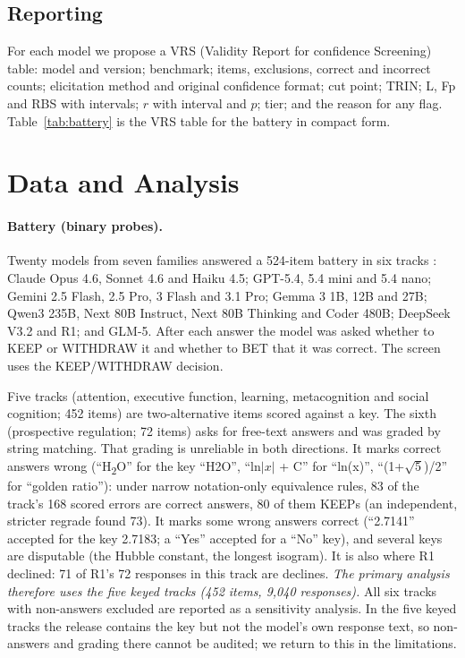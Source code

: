 \documentclass[11pt,a4paper]{article}
\begin{document}
\subsection{Reporting}

For each model we propose a VRS (Validity Report for confidence Screening) table: model and version; benchmark; items, exclusions, correct and incorrect counts; elicitation method and original confidence format; cut point; TRIN; L, Fp and RBS with intervals; $r$ with interval and $p$; tier; and the reason for any flag. Table~\ref{tab:battery} is the VRS table for the battery in compact form.

\section{Data and Analysis}\label{sec:data}

\paragraph{Battery (binary probes).} Twenty models from seven families answered a 524-item battery in six tracks \citep{cacioli2026c}: Claude Opus 4.6, Sonnet 4.6 and Haiku 4.5; GPT-5.4, 5.4 mini and 5.4 nano; Gemini 2.5 Flash, 2.5 Pro, 3 Flash and 3.1 Pro; Gemma 3 1B, 12B and 27B; Qwen3 235B, Next 80B Instruct, Next 80B Thinking and Coder 480B; DeepSeek V3.2 and R1; and GLM-5. After each answer the model was asked whether to KEEP or WITHDRAW it and whether to BET that it was correct. The screen uses the KEEP/WITHDRAW decision.

Five tracks (attention, executive function, learning, metacognition and social cognition; 452 items) are two-alternative items scored against a key. The sixth (prospective regulation; 72 items) asks for free-text answers and was graded by string matching. That grading is unreliable in both directions. It marks correct answers wrong (``H\textsubscript{2}O'' for the key ``H2O'', ``ln$|x|$ + C'' for ``ln(x)'', ``(1+$\sqrt{5}$)/2'' for ``golden ratio''): under narrow notation-only equivalence rules, 83 of the track's 168 scored errors are correct answers, 80 of them KEEPs (an independent, stricter regrade found 73). It marks some wrong answers correct (``2.7141'' accepted for the key 2.7183; a ``Yes'' accepted for a ``No'' key), and several keys are disputable (the Hubble constant, the longest isogram). It is also where R1 declined: 71 of R1's 72 responses in this track are declines. \emph{The primary analysis therefore uses the five keyed tracks (452 items, 9,040 responses).} All six tracks with non-answers excluded are reported as a sensitivity analysis. In the five keyed tracks the release contains the key but not the model's own response text, so non-answers and grading there cannot be audited; we return to this in the limitations.
\end{document}
